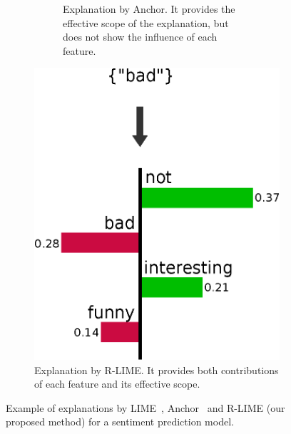 \documentclass[runningheads]{llncs}
\begin{document}
\begin{figure}[tbp]
\begin{subfigure}[t]{0.45\textwidth}
\begin{subfigure}[t]{\textwidth}
{        Explanation by Anchor.
        It provides the effective scope of the explanation,
        but does not show the influence of each feature.
      }\label{fig:example-anchor}
    \end{subfigure}
  \end{subfigure}
  \hspace{0.3cm}
  \begin{subfigure}[t]{0.45\textwidth}
    \centering
    \vspace{-2.24cm}
    \includegraphics[scale=\scale]{src/img/example-rlime}
    \caption{%
      Explanation by R-LIME\@.
      It provides both contributions of each feature and
      its effective scope.
    }\label{fig:example-rlime}
  \end{subfigure}
  \caption[Example of explanations by LIME, Anchor and R-LIME]{%
    Example of explanations by LIME~\cite{ribeiro2016why},
    Anchor~\cite{ribeiro2018anchors} and R-LIME (our proposed method)
    for a sentiment prediction model.
  }\label{fig:example}
\end{figure}
\end{document}
